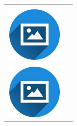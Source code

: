 \documentclass{article}
\begin{document}
\begin{paracol}{2}
\begin{tabular}{@{}ll}
\begin{minipage}{0.09\linewidth}
         \end{minipage} & {\color{maincolor}{skills.1}} \\[8pt]
         \begin{minipage}{0.09\linewidth}
         \includegraphics[width=\linewidth]{picon.png}
         \end{minipage} & {\color{maincolor}{skills.2}} \\[8pt]
         \begin{minipage}{0.09\linewidth}
         \includegraphics[width=\linewidth]{picon.png}

\end{minipage}
\end{tabular}
\end{paracol}
\end{document}
